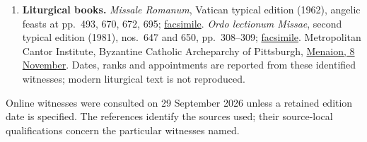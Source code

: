 \begin{enumerate}[leftmargin=1.7em,itemsep=0.5em]
\item \textbf{Liturgical books.} \emph{Missale Romanum}, Vatican typical
edition (1962), angelic feasts at pp.~493, 670, 672, 695;
\href{https://media.churchmusicassociation.org/pdf/missale62.pdf}{facsimile}.
\emph{Ordo lectionum Missae}, second typical edition (1981),
nos.~647 and 650, pp.~308--309;
\href{https://archive.org/details/OLM1981}{facsimile}.
Metropolitan Cantor Institute, Byzantine Catholic Archeparchy of Pittsburgh,
\href{https://mci.archpitt.org/menaion/11-08.html}{Menaion, 8 November}.
Dates, ranks and appointments are reported from these identified witnesses;
modern liturgical text is not reproduced.
\end{enumerate}

Online witnesses were consulted on 29 September 2026 unless a retained
edition date is specified. The references identify the sources used;
their source-local qualifications concern the particular witnesses named.

